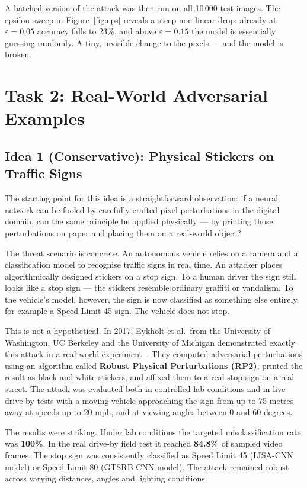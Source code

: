\documentclass[12pt, a4paper]{article}
\begin{document}
A batched version of the attack was then run on all 10\,000 test images.
The epsilon sweep in Figure~\ref{fig:eps} reveals a steep non-linear drop:
already at $\varepsilon = 0.05$ accuracy falls to 23\%, and above
$\varepsilon = 0.15$ the model is essentially guessing randomly. A tiny,
invisible change to the pixels — and the model is broken.

\section*{Task 2: Real-World Adversarial Examples}

\subsection*{Idea 1 (Conservative): Physical Stickers on Traffic Signs}

The starting point for this idea is a straightforward observation: if a
neural network can be fooled by carefully crafted pixel perturbations in
the digital domain, can the same principle be applied physically — by
printing those perturbations on paper and placing them on a real-world object?

The threat scenario is concrete. An autonomous vehicle relies on a camera
and a classification model to recognise traffic signs in real time. An
attacker places algorithmically designed stickers on a stop sign. To a
human driver the sign still looks like a stop sign — the stickers resemble
ordinary graffiti or vandalism. To the vehicle's model, however, the sign
is now classified as something else entirely, for example a Speed Limit 45
sign. The vehicle does not stop.

This is not a hypothetical. In 2017, Eykholt et al.\ from the University
of Washington, UC Berkeley and the University of Michigan demonstrated
exactly this attack in a real-world experiment~\cite{eykholt2017}. They
computed adversarial perturbations using an algorithm called
\textbf{Robust Physical Perturbations (RP2)}, printed the result as
black-and-white stickers, and affixed them to a real stop sign on a real
street. The attack was evaluated both in controlled lab conditions and in
live drive-by tests with a moving vehicle approaching the sign from up to
75 metres away at speeds up to 20 mph, and at viewing angles between
0 and 60 degrees.

The results were striking. Under lab conditions the targeted
misclassification rate was \textbf{100\%}. In the real drive-by field test
it reached \textbf{84.8\%} of sampled video frames. The stop sign was
consistently classified as Speed Limit 45 (LISA-CNN model) or Speed Limit
80 (GTSRB-CNN model). The attack remained robust across varying distances,
angles and lighting conditions.
\end{document}
